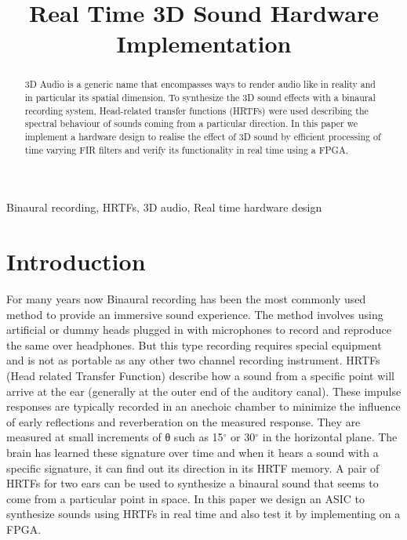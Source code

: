\documentclass[conference]{IEEEtran}
\begin{document}
\title{Real Time 3D Sound Hardware Implementation\\
}

\author{
\centering
{}
}

\maketitle

\begin{abstract}
3D Audio is a generic name that encompasses ways to render audio like in reality and in particular its spatial dimension. To synthesize the 3D sound effects with a binaural recording system, Head-related transfer functions (HRTFs) were used describing the spectral behaviour of sounds coming from a particular direction. In this paper we implement a hardware design to realise the effect of 3D sound by efficient processing of time varying FIR filters and verify its functionality in real time using a FPGA.  

\end{abstract}

\begin{IEEEkeywords}
Binaural recording, HRTFs, 3D audio, Real time hardware design
\end{IEEEkeywords}

\section{Introduction}
For many years now Binaural recording has been the most commonly used method to provide an immersive sound experience. The method involves using artificial or dummy heads plugged in with microphones to record and reproduce the same over headphones. But this type recording requires special equipment and is not as portable as any other two channel recording instrument. 
HRTFs (Head related Transfer Function) describe how a sound from a specific point will arrive at the ear (generally at the outer end of the auditory canal). These impulse responses are typically recorded in an anechoic chamber to minimize the influence of early reflections and reverberation on the measured response. They are measured at small increments of θ such as 15$^{\circ}$ or 30$^{\circ}$ in the horizontal plane. The brain has learned these signature over time and when it hears a sound with a specific signature, it can find out its direction in its HRTF memory. A pair of HRTFs for two ears can be used to synthesize a binaural sound that seems to come from a particular point in space. In this paper we design an ASIC to synthesize sounds using HRTFs in real time and also test it by implementing on a FPGA.  
\newline
\end{document}
